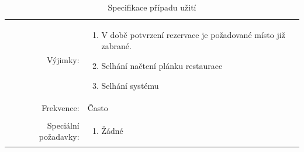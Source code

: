 \documentclass[a4paper,10pt]{article}
\begin{document}
\begin{table}[ht!]
{\begin{tabular}{| r | p{12cm} |}
\begin{minipage}[t]{0.75\textwidth}
  	\end{minipage} \\
    \hline
    Výjimky: & 
    \begin{minipage}[t]{0.75\textwidth}
    	\begin{enumerate}[nosep,after=\strut]
    		\item V době potvrzení rezervace je požadované místo již zabrané.
            \item Selhání načtení plánku restaurace
            \item Selhání systému
    	\end{enumerate}
  	\end{minipage} \\
    \hline
    Frekvence: & Často \\
    \hline
    Speciální požadavky: & 
    \begin{minipage}[t]{0.75\textwidth}
    	\begin{enumerate}[nosep,after=\strut]
    		\item Žádné
    	\end{enumerate}
  	\end{minipage} \\
    \hline

\end{tabular}}
\caption{Specifikace případu užití }
\label{table:1}
\end{table}


\end{document}
